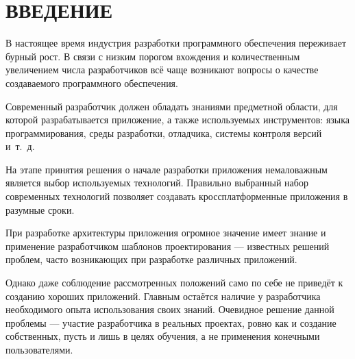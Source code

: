 \section*{\centering ВВЕДЕНИЕ}

\vspace{0.6cm}

В настоящее время индустрия разработки программного обеспечения переживает
бурный рост. В связи с низким порогом вхождения и количественным увеличением
числа разработчиков всё чаще возникают вопросы о качестве создаваемого программного
обеспечения.

Современный разработчик должен обладать знаниями предметной области, для которой
разрабатывается приложение, а также используемых инструментов: языка программирования,
среды разработки, отладчика, системы контроля версий и~т.~д.

На этапе принятия решения о начале разработки приложения немаловажным является
выбор используемых технологий. Правильно выбранный набор современных технологий
позволяет создавать кроссплатформенные приложения в разумные сроки.

При разработке архитектуры приложения огромное значение имеет знание и применение
разработчиком шаблонов проектирования --- известных решений проблем, часто
возникающих при разработке различных приложений.

Однако даже соблюдение рассмотренных положений само по себе не приведёт
к созданию хороших приложений. Главным остаётся наличие у разработчика
необходимого опыта использования своих знаний. Очевидное решение
данной проблемы --- участие разработчика в реальных проектах, ровно
как и создание собственных, пусть и лишь в целях обучения, а не применения
конечными пользователями.